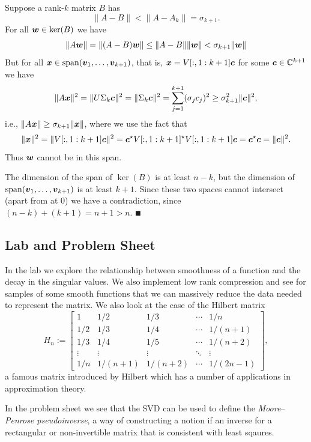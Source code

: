 Suppose a rank-$k$ matrix $B$ has 
\[
\|A-B\|  < \|A-A_k\| = \ensuremath{\sigma}_{k+1}.
\]
For all $\bm{{\mbox{\boldmath$w$\unboldmath}}} \in \ker(B)$ we have 
\[
\|A \bm{{\mbox{\boldmath$w$\unboldmath}}}\| = \|(A-B) \bm{{\mbox{\boldmath$w$\unboldmath}}}\| \leq \|A-B\|\|\bm{{\mbox{\boldmath$w$\unboldmath}}}\|  < \sigma_{k+1} \|\bm{{\mbox{\boldmath$w$\unboldmath}}}\|
\]
But for all $\bm{{\mbox{\boldmath$x$\unboldmath}}} \in {\rm span}(\bm{{\mbox{\boldmath$v$\unboldmath}}}_1,\ldots,\bm{{\mbox{\boldmath$v$\unboldmath}}}_{k+1})$, that is, $\bm{{\mbox{\boldmath$x$\unboldmath}}} = V[:,1:k+1]\bm{{\mbox{\boldmath$c$\unboldmath}}}$ for some $\bm{{\mbox{\boldmath$c$\unboldmath}}} \in {\mathbb C}^{k+1}$  we have 
\[
\|A \bm{{\mbox{\boldmath$x$\unboldmath}}}\|^2 = \|U \Sigma_k \bm{{\mbox{\boldmath$c$\unboldmath}}}\|^2 = \|\Sigma_k \bm{{\mbox{\boldmath$c$\unboldmath}}}\|^2 =
\sum_{j=1}^{k+1} (\sigma_j c_j)^2 \geq \sigma_{k+1}^2 \| \bm{{\mbox{\boldmath$c$\unboldmath}}}  \|^2,
\]
i.e., $\|A \bm{{\mbox{\boldmath$x$\unboldmath}}}\| \geq \sigma_{k+1} \|\bm{{\mbox{\boldmath$x$\unboldmath}}}\|$, where we use the fact that
\[
\|\bm{{\mbox{\boldmath$x$\unboldmath}}}\|^2 = \|V[:,1:k+1]\bm{{\mbox{\boldmath$c$\unboldmath}}}\|^2 = \bm{{\mbox{\boldmath$c$\unboldmath}}}^\star V[:,1:k+1]^\star V[:,1:k+1]\bm{{\mbox{\boldmath$c$\unboldmath}}} = \bm{{\mbox{\boldmath$c$\unboldmath}}}^\star\bm{{\mbox{\boldmath$c$\unboldmath}}} = \|\bm{{\mbox{\boldmath$c$\unboldmath}}}\|^2.
\]
Thus $\bm{{\mbox{\boldmath$w$\unboldmath}}}$ cannot be in this span.

The dimension of the span of $\ker(B)$ is at least $n-k$, but the dimension of ${\rm span}(\bm{{\mbox{\boldmath$v$\unboldmath}}}_1,\ldots,\bm{{\mbox{\boldmath$v$\unboldmath}}}_{k+1})$ is at least $k+1$. Since these two spaces cannot intersect (apart from at 0) we have a contradiction, since $(n-k) + (k+1) = n+1 > n$.  \ensuremath{\QED}

\subsection{Lab and Problem Sheet}
In the lab we explore the relationship between smoothness of a function and the decay in the singular values. We also implement low rank compression and see for samples of some smooth functions that we can massively reduce the data needed to represent the matrix. We also look at the case of the Hilbert matrix
\[
H_n := \begin{bmatrix} 1 & 1/2 & 1/3 & \ensuremath{\cdots} & 1/n \\
                      1/2 & 1/3 & 1/4 & \ensuremath{\cdots} & 1/(n+1) \\
                       1/3 & 1/4 & 1/5 & \ensuremath{\cdots} & 1/(n+2) \\
                       \ensuremath{\vdots} & \ensuremath{\vdots} & \ensuremath{\vdots} & \ensuremath{\ddots} & \ensuremath{\vdots} \\
                       1/n & 1/(n+1) & 1/(n+2) & \ensuremath{\cdots} & 1/(2n-1)
                       \end{bmatrix},
\]
a famous matrix introduced by Hilbert which has a number of applications in approximation theory.

In the problem sheet we see that the SVD can be used to define the \emph{Moore\ensuremath{\endash}Penrose pseudoinverse}, a way of  constructing a notion if an inverse for a rectangular or non-invertible matrix that is consistent with least sqaures.



